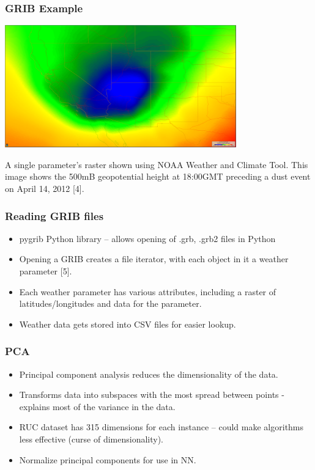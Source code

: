 \documentclass{beamer}
\begin{document}
\begin{frame}
	\frametitle{GRIB Example}
	\centering
	\includegraphics[width=0.75\textwidth]{images/abqlow.png}

	A single parameter's raster shown using NOAA Weather and Climate Tool. This image shows the 500mB geopotential height at 18:00GMT preceding a dust event on April 14, 2012 [4].


\end{frame}
\begin{frame}
	\frametitle{Reading GRIB files}
	\begin{itemize}
		\item
			pygrib Python library -- allows opening of .grb, .grb2 files in Python
		\item
			Opening a GRIB creates a file iterator, with each object in it a weather parameter [5].
		\item
			Each weather parameter has various attributes, including a raster of latitudes/longitudes and data for the parameter.
		\item
			Weather data gets stored into CSV files for easier lookup.
	\end{itemize}

\end{frame}
\begin{frame}
	\frametitle{PCA}
	\begin{itemize}
		\item
			Principal component analysis reduces the dimensionality of the data.
		\item 
			Transforms data into subspaces with the most spread between points - explains most of the variance in the data.
		\item
			RUC dataset has 315 dimensions for each instance -- could make algorithms less effective (curse of dimensionality).
		\item
			Normalize principal components for use in NN.


	\end{itemize}

\end{frame}
\end{document}
